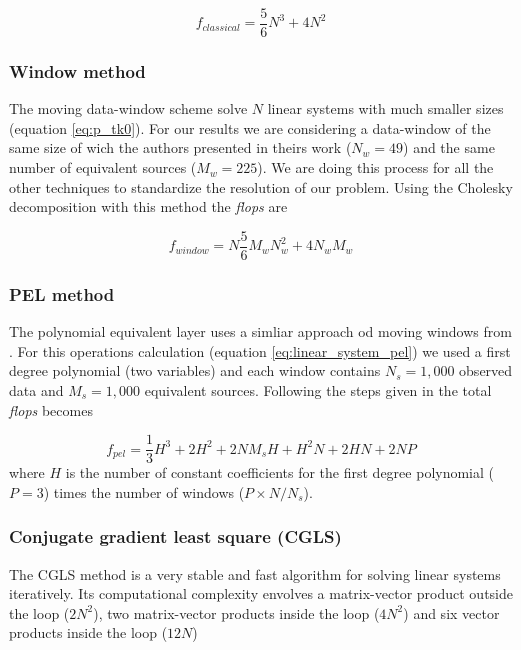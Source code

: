 \begin{equation}
	f_{classical} = \dfrac{5}{6} N^3 + 4N^2
\label{flops_classical}
\end{equation}

\subsubsection{Window method \citep{leao-silva1989}}

The moving data-window scheme \citep{leao-silva1989} solve $N$ linear systems with much smaller sizes (equation \ref{eq:p_tk0}). For our results we are considering a data-window of the same size of wich the authors presented in theirs work ($N_w = 49$) and the same number of equivalent sources ($M_w = 225$). We are doing this process for all the other techniques to standardize the resolution of our problem. Using the Cholesky decomposition with this method the \textit{flops} are

\begin{equation}
	f_{window} = N\dfrac{5}{6} M_w N_w^2 + 4N_w M_w
\label{flops_leao-silva}
\end{equation}

\subsubsection{PEL method \citep{oliveirajr-etal2013}}

The polynomial equivalent layer uses a simliar approach od moving windows from \cite{leao-silva1989}. For this operations calculation (equation \ref{eq:linear_system_pel}) we used a first degree polynomial (two variables) and each window contains $N_s = 1,000$ observed data and $M_s = 1,000$ equivalent sources. Following the steps given in \citep{oliveirajr-etal2013} the total \textit{flops} becomes

\begin{equation}
	f_{pel} = \dfrac{1}{3} H^3 + 2H^2 + 2NM_sH + H^2N + 2HN + 2NP
\label{flops_pel}
\end{equation}
where $H$ is the number of constant coefficients for the first degree polynomial ($P = 3$) times the number of windows  ($P \times N/N_s$).

\subsubsection{Conjugate gradient least square (CGLS)}

The CGLS method is a very stable and fast algorithm for solving linear systems iteratively. Its computational complexity envolves a matrix-vector product outside the loop ($2N^2$), two matrix-vector products inside the loop ($4N^2$) and six vector products inside the loop ($12N$) \citep{aster2018parameter}

